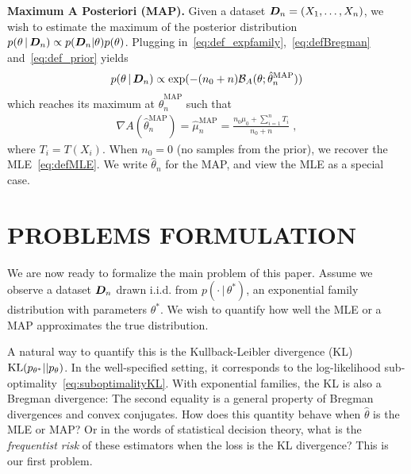 \documentclass[twoside]{article}
\let\oldsection\section
\renewcommand{\section}[1]{\oldsection{\texorpdfstring{\uppercase{#1}}{#1}}}
\newcommand{\cond}{\,\vert\,}
\newcommand{\logpart}{A}
\newcommand{\bregman}{\cB_\logpart}
\newcommand{\bregmanconj}{\cB_{\logpart^*}}
\newcommand{\nat}{\theta}
\newcommand{\m}{\mu}
\newcommand{\meanp}{\m}
\newcommand{\MAPm}{\hat \m_n}
\newcommand{\MAPt}{\hat \nat_n}
\begin{document}
{\bf Maximum A Posteriori (MAP).}
Given a dataset ${\bm{D}}_n =(X_1,\dots,X_n)$, we wish to estimate the maximum of the posterior distribution $p(\nat \cond \mD_n) \propto p(\mD_n|\nat)p(\nat)$.
Plugging in~\eqref{eq:def_expfamily},~\eqref{eq:defBregman} and~\eqref{eq:def_prior} yields
\begin{align}
	p(\nat \cond \mD_n)
    \propto \exp(- (n_0+n) \bregman(\nat; \MAPt^\text{MAP}))
    \label{eq:joint_likelihood}
\end{align}
which reaches its maximum at $\MAPt^\text{MAP}$ such that
\begin{align}
    \nabla \logpart(\MAPt^\text{MAP}) = \MAPm^\text{MAP}
    = \frac{n_0 \meanp_0 + \sum_{i=1}^n T_i}{n_0+n} \; ,
    \label{eq:defMAP}
\end{align}
where $T_i=T(X_i)$.
When $n_0=0$ (no samples from the prior), we recover the MLE~\eqref{eq:defMLE}.
We write $\MAPt$ for the MAP, and view the MLE as a special case.


\section{PROBLEMS FORMULATION}
\label{sec:problem}

We are now ready to formalize the main problem of this paper. Assume we observe a dataset ${\bm{D}}_n$ drawn i.i.d. from $p(\cdot \cond\nat^*)$, an exponential family distribution
with parameters $\nat^*$.
We wish to quantify how well the MLE or a MAP approximates the true distribution.

A natural way to quantify this is the Kullback-Leibler divergence (KL) $\KL(p_{\nat^*} || p_\nat)$. %
In the well-specified setting, it corresponds to the log-likelihood sub-optimality~\eqref{eq:suboptimalityKL}.
With exponential families, the KL is also a Bregman divergence:
\alignn{
	\KL(p_{\nat^*} || p_\nat)
	 = \bregman(\nat ; \nat^*)
	 = \bregmanconj(\m^* ; \m) \; .
}
The second equality is a general property of Bregman divergences and convex conjugates. %
How does this quantity behave when $\hat \nat$ is the MLE or MAP?
 Or in the words of statistical decision theory, what is the \emph{frequentist risk} of these estimators when the loss is the KL divergence?
This is our first problem.
\end{document}
